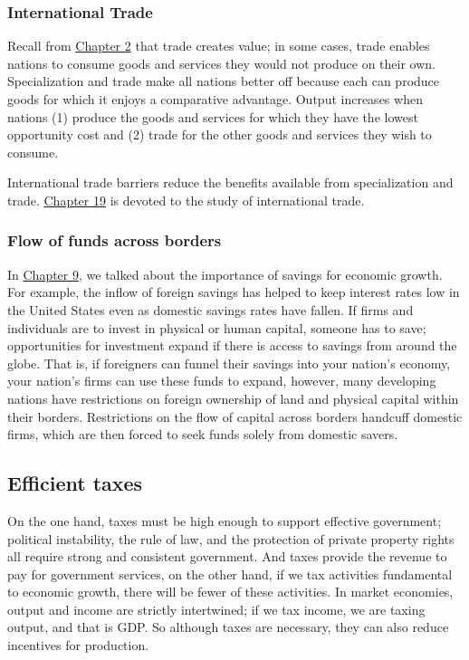 \documentclass[11pt]{article} %
\begin{document}
\subsubsection*{International Trade}
Recall from \underline{Chapter 2} that trade creates value; in some cases, trade enables nations to consume goods and services they would not produce on their own. Specialization and trade make all nations better off because each can produce goods for which it enjoys a comparative advantage. Output increases when nations (1) produce the goods and services for which they have the lowest opportunity cost and (2) trade for the other goods and services they wish to consume.

International trade barriers reduce the benefits available from specialization and trade. \underline{Chapter 19} is devoted to the study of international trade.

\subsubsection*{Flow of funds across borders}

In \underline{Chapter 9}, we talked about the importance of savings for economic growth. For example, the inflow of foreign savings has helped to keep interest rates low in the United States even as domestic savings rates have fallen. If firms and individuals are to invest in physical or human capital, someone has to save; opportunities for investment expand if there is access to savings from around the globe. That is, if foreigners can funnel their savings into your nation's economy, your nation's firms can use these funds to expand, however, many developing nations have restrictions on foreign ownership of land and physical capital within their borders. Restrictions on the flow of capital across borders handcuff domestic firms, which are then forced to seek funds solely from domestic savers.

\subsection*{Efficient taxes}

On the one hand, taxes must be high enough to support effective government; political instability, the rule of law, and the protection of private property rights all require strong and consistent government. And taxes provide the revenue to pay for government services, on the other hand, if we tax activities fundamental to economic growth, there will be fewer of these activities. In market economies, output and income are strictly intertwined; if we tax income, we are taxing output, and that is GDP. So although taxes are necessary, they can also reduce incentives for production.
\end{document}
